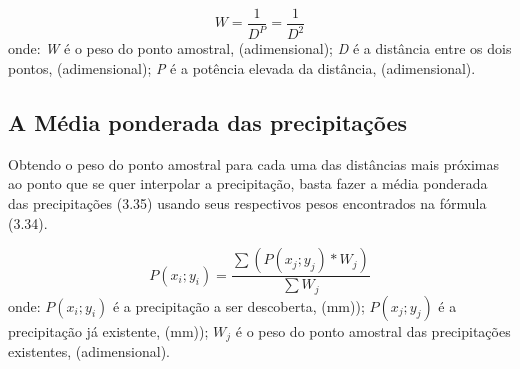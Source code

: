 \begin{equation}
W = \frac{1}{D^P} = \frac{1}{D^2}
\end{equation}
\newline
onde:
\newline
\textit{W} é o peso do ponto amostral, (adimensional);
\newline
\textit{D} é a distância entre os dois pontos, (adimensional);
\newline
\textit{P} é a potência elevada da distância, (adimensional).\bigskip

\subsection{A Média ponderada das precipitações}\bigskip

Obtendo o peso do ponto amostral para cada uma das distâncias mais próximas ao ponto que se quer interpolar a precipitação, basta fazer a média ponderada das precipitações (3.35) usando seus respectivos pesos encontrados na fórmula (3.34).\bigskip

\begin{equation}
P(x_i ; y_i) = \frac{\sum{\left(P(x_j ; y_j) * W_j\right)}}{\sum{W_j}}
\end{equation}
\newline
onde:
\newline
$P(x_i ; y_i)$ é a precipitação a ser descoberta, (mm));
\newline
$P(x_j ; y_j)$ é a precipitação já existente, (mm));
\newline
$W_j$ é o peso do ponto amostral das precipitações existentes, (adimensional).\bigskip
